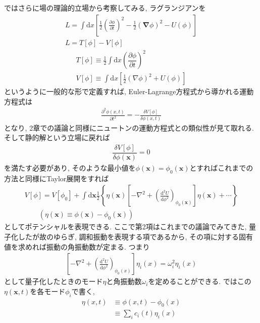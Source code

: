 \documentclass[dvipdfmx,11pt,a4paper,oneside,openany]{jsbook}
\begin{document}
ではさらに場の理論的立場から考察してみる, ラグランジアンを
\begin{align}
    L=\int \mathrm{d} x\left[\frac{1}{2}\left(\frac{\partial \phi}{\partial t}\right)^{2}-\frac{1}{2}(\boldsymbol{\nabla} \phi)^{2}-U(\phi)\right]\nonumber \\
    L=T[\phi]-V[\phi]
\end{align}
\begin{subequations}
    \begin{align}
        T[\phi]\equiv\frac{1}{2}\int \mathrm{d}x\left(\dfrac{\partial \phi}{\partial t}\right)^2 \\
        V[\phi] \equiv \int \mathrm{d} x\left[\frac{1}{2}(\nabla \phi)^{2}+U(\phi)\right]
    \end{align}
\end{subequations}
というように一般的な形で定義すれば, Euler-Lagrange方程式から導かれる運動方程式は
\begin{align}
    \frac{\partial^{2} \phi(x, t)}{\partial t^{2}}=-\frac{\delta V[\phi]}{\delta \phi(x, t)}
\end{align}
となり, 2章での議論と同様にニュートンの運動方程式との類似性が見て取れる. そして静的解という立場に戻れば
\begin{align}
    \dfrac{\delta V[\phi]}{\delta \phi(\bm{x})}=0
\end{align}
を満たす必要があり, そのような最小値を$\phi(\bm{x})=\phi_0(\bm{x})$とすればこれまでの方法と同様にTaylor展開をすれば
\begin{align}
    V[\phi]=V\left[\phi_{0}\right]+\int \mathrm{d} \bm{x} \frac{1}{2}\left\{\eta(\bm{x})\left[-\nabla^{2}+\left(\frac{\mathrm{d}^{2} U}{\mathrm{d} \phi^{2}}\right)_{\phi_{0}(\bm{x})}\right] \eta(\bm{x})+\cdots\right\}\label{eq:5.23} \\
    \qquad \left(\eta(\bm{x})\equiv \phi(\bm{x})-\phi_0(\bm{x})\right)\nonumber
\end{align}
としてポテンシャルを表現できる. ここで第2項はこれまでの議論でみてきた, 量子化したが故のゆらぎ, 調和振動を表現する項であるから, その項に対する固有値を求めれば振動の角振動数が定まる. つまり
\begin{align}
    \left[-\nabla^{2}+\left(\frac{\mathrm{d}^{2} U}{\mathrm{d} \phi^{2}}\right)_{\phi_{0}(x)}\right] \eta_{i}(x)=\omega_{i}^{2} \eta_{i}(x)\label{eq:5.24}
\end{align}
として量子化したときのモード$\eta$と角振動数$\omega_i$を定めることができる. ではこの$\eta(\bm{x},t)$を各モード$\phi_i$で書く,
\begin{align}
    \eta(x, t) & \equiv \phi(x, t)-\phi_{0}(x)\nonumber \\
               & \equiv \sum_{i} c_{i}(t) \eta_{i}(x)
\end{align}
\end{document}
